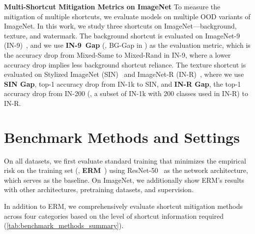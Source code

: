 \documentclass[10pt,twocolumn,letterpaper]{article}
\begin{document}
\noindent \textbf{Multi-Shortcut Mitigation Metrics on ImageNet} \quad To measure the mitigation of multiple shortcuts, we evaluate models on multiple OOD variants of ImageNet. In this work, we study three shortcuts on ImageNet---background, texture, and watermark. The background shortcut is evaluated on ImageNet-9 (IN-9)~\cite{xiao2021Int.Conf.Learn.Represent.Noise}, and we use \textbf{IN-9~Gap} (\ie, BG-Gap in \cite{xiao2021Int.Conf.Learn.Represent.Noise}) as the evaluation metric, which is the accuracy drop from Mixed-Same to Mixed-Rand in IN-9, where a lower accuracy drop implies less background shortcut reliance. The texture shortcut is evaluated on Stylized ImageNet (SIN)~\cite{geirhos2019Int.Conf.Learn.Represent.ImageNettrained} and ImageNet-R (IN-R)~\cite{hendrycks2021IEEECVFInt.Conf.Comput.Vis.ICCVMany}, where we use \textbf{SIN Gap}, top-1 accuracy drop from IN-1k to SIN, and \textbf{IN-R Gap}, the top-1 accuracy drop from IN-200 (\ie, a subset of IN-1k with 200 classes used in IN-R) to IN-R.


\section{Benchmark Methods and Settings}
\label{subsec:benchmark_and_comparison_methods}

On all datasets, we first evaluate standard training that minimizes the empirical risk on the training set (\ie, \textbf{ERM}~\cite{vapnik1999Nature}) using ResNet-50~\cite{he2016IEEEConf.Comput.Vis.PatternRecognit.CVPRDeep} as the network architecture, which serves as the baseline. On ImageNet, we additionally show ERM's results with other architectures, pretraining datasets, and supervision.

In addition to ERM, we comprehensively evaluate shortcut mitigation methods across four categories based on the level of shortcut information required (\cref{tab:benchmark_methods_summary}).
\end{document}
